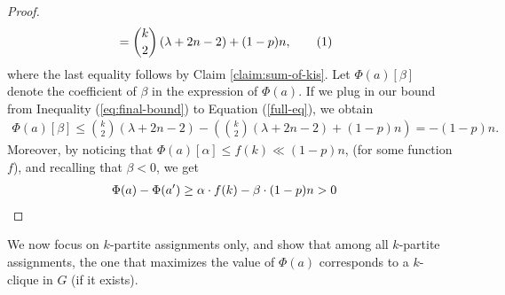 \documentclass[a4paper,UKenglish,cleveref, autoref, thm-restate,numberwithinsect]{lipics-v2021}
\newcommand*\tageq{\refstepcounter{equation}\tag{\theequation}}
\begin{document}
\begin{proof}
\begin{align*}
        & = \binom{k}{2}\left(\lambda + 2n-2\right) + (1-p)n, \tageq\label{eq:final-bound}
    \end{align*}
    where the last equality follows by Claim \ref{claim:sum-of-kis}.
    Let $\Phi(a)[\beta]$ denote the coefficient of $\beta$ in the expression of $\Phi(a)$.
    If we plug in our bound from Inequality (\ref{eq:final-bound}) to Equation (\ref{full-eq}), we obtain
    \begin{align*}
        \Phi(a)[\beta] \leq  \binom{k}{2} (\lambda + 2n-2) - \left(\binom{k}{2}\left(\lambda + 2n-2\right) + (1-p)n\right) = -(1-p)n. 
    \end{align*}
    Moreover, by noticing that $\Phi(a)[\alpha] \leq f(k)\ll(1-p)n$, (for some function $f$), and recalling that $\beta<0$, we get
     \begin{align*}
          \Phi(a)-\Phi(a') & \geq \alpha \cdot f(k) - \beta \cdot (1-p)n >0 \qedhere
     \end{align*}
\end{proof}
We now focus on $k$-partite assignments only, and show that among all $k$-partite assignments, the one that maximizes the value of $\Phi(a)$ corresponds to a $k$-clique in $G$ (if it exists).
\end{document}
